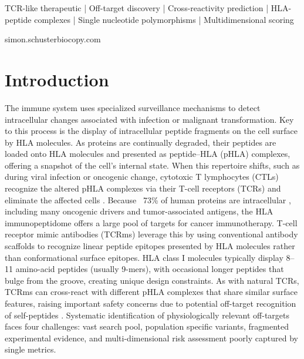 \documentclass[times, twoside, watermark]{zHenriquesLab-StyleBioRxiv}
\begin{document}
\begin{keywords}
TCR-like therapeutic | Off-target discovery | Cross-reactivity prediction | HLA-peptide complexes | Single nucleotide polymorphisms | Multidimensional scoring
\end{keywords}

\begin{corrauthor}
simon.schuster\at biocopy.com
\end{corrauthor}

\section*{Introduction}
    The immune system uses specialized surveillance mechanisms to detect intracellular changes associated with infection or malignant transformation. Key to this process is the display of intracellular peptide fragments on the cell surface by HLA molecules. As proteins are continually degraded, their peptides are loaded onto HLA molecules and presented as peptide–HLA (pHLA) complexes, offering a snapshot of the cell’s internal state. When this repertoire shifts, such as during viral infection or oncogenic change, cytotoxic T lymphocytes (CTLs) recognize the altered pHLA complexes via their T-cell receptors (TCRs) and eliminate the affected cells \cite{pishesha2022guide}.
    Because ~73\% of human proteins are intracellular \cite{chandran2019t}, including many oncogenic drivers and tumor-associated antigens, the HLA immunopeptidome offers a large pool of targets for cancer immunotherapy. T-cell receptor mimic antibodies (TCRms) leverage this by using conventional antibody scaffolds to recognize linear peptide epitopes presented by HLA molecules rather than conformational surface epitopes. HLA class I molecules typically display 8–11 amino-acid peptides (usually 9-mers), with occasional longer peptides that bulge from the groove, creating unique design constraints. As with natural TCRs, TCRms can cross-react with different pHLA complexes that share similar surface features, raising important safety concerns due to potential off-target recognition of self-peptides \cite{molldrem2024unlocking, hoydahl2024engineering, marrer2024physiological}.
    Systematic identification of physiologically relevant off-targets faces four challenges: vast search pool, population specific variants, fragmented experimental evidence, and multi-dimensional risk assessment poorly captured by single metrics.
\end{document}
